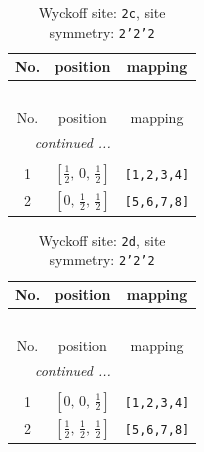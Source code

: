 \documentclass[fleqn,8pt]{jsarticle}
\begin{document}
\begin{longtable}{ccc}
\caption{Wyckoff site: {\tt 2c}, site symmetry: {\tt 2'2'2}}
 \\
 \hline \hline
No. & position & mapping \\ \hline \endfirsthead

\multicolumn{2}{l}{\tablename\ \thetable{}} \\
 \hline \hline
No. & position & mapping \\ \hline \endhead

 \hline \hline
\multicolumn{2}{r}{\footnotesize\it continued ...} \\ \endfoot

 \hline \hline
\multicolumn{2}{r}{} \\ \endlastfoot

1 & $\left[ \frac{1}{2},\, 0,\, \frac{1}{2} \right]$ & {\tt [1,2,3,4]} \\ \hline
2 & $\left[ 0,\, \frac{1}{2},\, \frac{1}{2} \right]$ & {\tt [5,6,7,8]} \\
\end{longtable}
\renewcommand{\arraystretch}{1.2}
\begin{longtable}{ccc}
\caption{Wyckoff site: {\tt 2d}, site symmetry: {\tt 2'2'2}}
 \\
 \hline \hline
No. & position & mapping \\ \hline \endfirsthead

\multicolumn{2}{l}{\tablename\ \thetable{}} \\
 \hline \hline
No. & position & mapping \\ \hline \endhead

 \hline \hline
\multicolumn{2}{r}{\footnotesize\it continued ...} \\ \endfoot

 \hline \hline
\multicolumn{2}{r}{} \\ \endlastfoot

1 & $\left[ 0,\, 0,\, \frac{1}{2} \right]$ & {\tt [1,2,3,4]} \\ \hline
2 & $\left[ \frac{1}{2},\, \frac{1}{2},\, \frac{1}{2} \right]$ & {\tt [5,6,7,8]} \\
\end{longtable}
\renewcommand{\arraystretch}{1.2}
\end{document}
